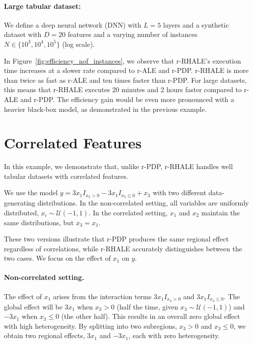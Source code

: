 \documentclass[sigconf, nonacm]{acmart}
\begin{document}
\paragraph{Large tabular dataset:}

We define a deep neural network (DNN) with \( L = 5 \) layers and a synthetic dataset with \( D = 20 \) features and a varying number of instances \( N \in \{10^3, 10^4, 10^5\} \) (log scale).

In Figure~\ref{fig:efficiency_nof_instances}, we observe that r-RHALE's execution time increases at a slower rate compared to r-ALE and r-PDP. r-RHALE is more than twice as fast as r-ALE and ten times faster than r-PDP. For large datasets, this means that r-RHALE executes 20 minutes and 2 hours faster compared to r-ALE and  r-PDP. The efficiency gain would be even more pronounced with a heavier black-box model, as demonstrated in the previous example.


\section{Correlated Features}
\label{sec:correlated-features}

In this example, we demonstrate that, unlike r-PDP, r-RHALE handles well tabular datasets with correlated features.

We use the model \( y = 3x_1I_{x_3 > 0} - 3x_1I_{x_3 \leq 0} + x_3 \) with two different data-generating distributions. In the non-correlated setting, all variables are uniformly distributed, \( x_i \sim \mathcal{U}(-1,1) \). In the correlated setting, \( x_1 \) and \( x_2 \) maintain the same distributions, but \( x_3 = x_1 \).

These two versions illustrate that r-PDP produces the same regional effect regardless of correlations, while r-RHALE accurately distinguishes between the two cases. We focus on the effect of \( x_1 \) on \( y \).

\paragraph{Non-correlated setting.}

The effect of \( x_1 \) arises from the interaction terms \( 3x_1I_{x_3>0} \) and \( 3x_1I_{x_3\leq0} \). The global effect will be \( 3x_1 \) when \( x_3 > 0 \) (half the time, given \( x_3 \sim \mathcal{U}(-1,1) \)) and \( -3x_1 \) when \( x_3 \leq 0 \) (the other half). This results in an overall zero global effect with high heterogeneity. By splitting into two subregions, \( x_3 > 0 \) and \( x_3 \leq 0 \), we obtain two regional effects, \( 3x_1 \) and \( -3x_1 \), each with zero heterogeneity.
\end{document}
